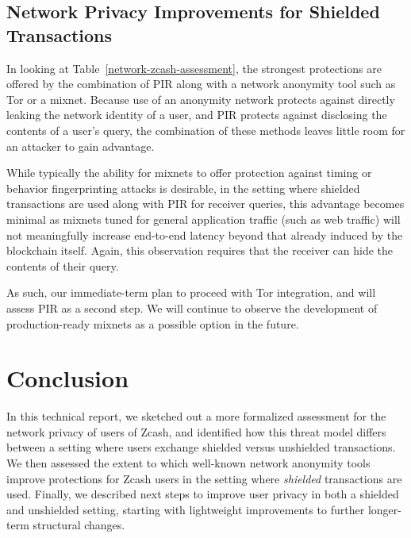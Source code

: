 \documentclass{article}
\begin{document}
\subsection{Network Privacy Improvements for Shielded Transactions}

In looking at Table~\ref{network-zcash-assessment}, the strongest protections
are offered by the combination of PIR along with a network anonymity tool such
as Tor or a mixnet. Because use of an anonymity network protects against
directly leaking the network identity of a user, and PIR protects against
disclosing the contents of a user's query, the combination of these methods
leaves little room for an attacker to gain advantage.

While typically the
ability for mixnets to offer protection
against timing or behavior fingerprinting attacks is desirable,
in the setting where shielded transactions are used along
with PIR for receiver queries, this advantage becomes minimal as mixnets tuned
for general application traffic (such as web traffic) will not meaningfully
increase  end-to-end latency beyond that already induced by the blockchain
itself.
Again, this observation requires that the receiver can hide the contents of
their query.

As such, our immediate-term plan to proceed with Tor integration, and will
assess PIR as a second step.
We will continue to observe the development of production-ready mixnets as a
possible option in the future.

\section{Conclusion}
\label{conclusion}

In this technical report, we sketched out a more formalized assessment for the
network privacy of
users of Zcash, and identified how this threat model differs between a setting
where users exchange shielded versus unshielded transactions. We then assessed
the extent to which well-known network anonymity tools improve protections for
Zcash users in the setting where \emph{shielded} transactions are used.
Finally, we described next steps to improve user privacy in both a shielded and
unshielded setting, starting with lightweight improvements to further
longer-term structural changes.



\end{document}

